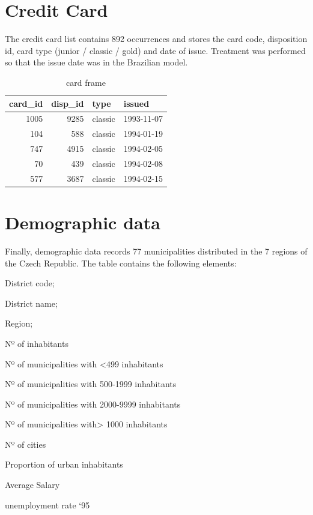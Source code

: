 \documentclass[]{book}
\begin{document}
\section{Credit Card}\label{credit-card}

The credit card list contains 892 occurrences and stores the card code,
disposition id, card type (junior / classic / gold) and date of issue.
Treatment was performed so that the issue date was in the Brazilian
model.

\begin{table}[t]

\caption{\label{tab:unnamed-chunk-10}card frame}
\centering
\begin{tabular}{r|r|l|l}
\hline
card\_id & disp\_id & type & issued\\
\hline
1005 & 9285 & classic & 1993-11-07\\
\hline
104 & 588 & classic & 1994-01-19\\
\hline
747 & 4915 & classic & 1994-02-05\\
\hline
70 & 439 & classic & 1994-02-08\\
\hline
577 & 3687 & classic & 1994-02-15\\
\hline
\end{tabular}
\end{table}

\section{Demographic data}\label{demographic-data}

Finally, demographic data records 77 municipalities distributed in the 7
regions of the Czech Republic. The table contains the following
elements:

District code;

District name;

Region;

Nº of inhabitants

Nº of municipalities with \textless{}499 inhabitants

Nº of municipalities with 500-1999 inhabitants

Nº of municipalities with 2000-9999 inhabitants

Nº of municipalities with\textgreater{} 1000 inhabitants

Nº of cities

Proportion of urban inhabitants

Average Salary

unemployment rate `95
\end{document}
